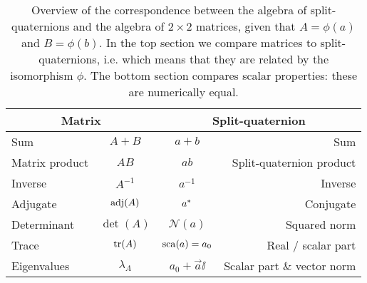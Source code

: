     
\renewcommand{\arraystretch}{1.3}
\begin{table}
    \centering
    \caption{Overview of the correspondence between the algebra of split-quaternions and the algebra of $2\times2$ matrices, given that $A = \phi(a)$ and $B = \phi(b)$. In the top section we compare matrices to split-quaternions, i.e. which means that they are related by the isomorphism $\phi$. The bottom section compares scalar properties: these are numerically equal.}
    \label{tab:spquat_matrices}
    \begin{tabular}{lc|cr}
    \toprule
        \multicolumn{2}{c}{\textbf{Matrix}} & \multicolumn{2}{c}{\textbf{Split-quaternion}} \\
    \midrule
        Sum      & $ A + B $      & $ a + b$ & Sum \\
        Matrix product  & $ AB $  & $ ab$ & Split-quaternion product \\
        Inverse  & $A^{-1}$       & $a^{-1}$ & Inverse \\
        Adjugate & $\operatorname{adj}(A)$ & $a^*$ & Conjugate \\
        \midrule
        Determinant & $\det(A)$ & $\mathscr{N}(a)$ & Squared norm \\
        Trace       & $\trace(A)$ & $\mathrm{sca}\qty(a) = a_0$ & Real / scalar part \\
        Eigenvalues \hspace{1.5cm} & $\lambda_{A} $ & $ a_0 + \vec{a}\ii $ & Scalar part \& vector norm \\
    \bottomrule
    \end{tabular}
\end{table}
\renewcommand{\arraystretch}{1}

